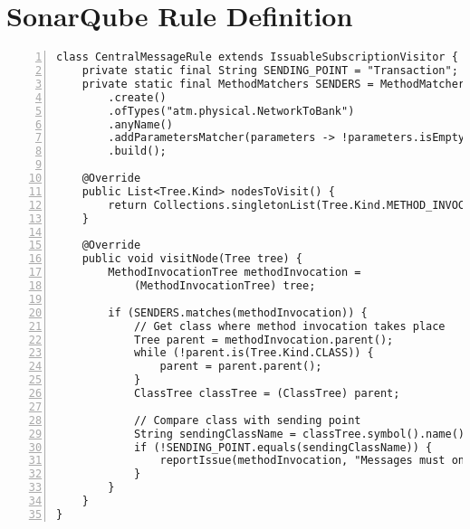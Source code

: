 \chapter{SonarQube Rule Definition}

\begin{lstlisting}[label=lst:sonarqube_rule, numbers=left, showstringspaces=false]
class CentralMessageRule extends IssuableSubscriptionVisitor {
    private static final String SENDING_POINT = "Transaction";
    private static final MethodMatchers SENDERS = MethodMatchers
        .create()
        .ofTypes("atm.physical.NetworkToBank")
        .anyName()
        .addParametersMatcher(parameters -> !parameters.isEmpty())
        .build();

    @Override
    public List<Tree.Kind> nodesToVisit() {
        return Collections.singletonList(Tree.Kind.METHOD_INVOCATION);
    }

    @Override
    public void visitNode(Tree tree) {
        MethodInvocationTree methodInvocation =
            (MethodInvocationTree) tree;

        if (SENDERS.matches(methodInvocation)) {
            // Get class where method invocation takes place
            Tree parent = methodInvocation.parent();
            while (!parent.is(Tree.Kind.CLASS)) {
                parent = parent.parent();
            }
            ClassTree classTree = (ClassTree) parent;

            // Compare class with sending point
            String sendingClassName = classTree.symbol().name();
            if (!SENDING_POINT.equals(sendingClassName)) {
                reportIssue(methodInvocation, "Messages must only be sent from the sending point");
            }
        }
    }
}
\end{lstlisting}